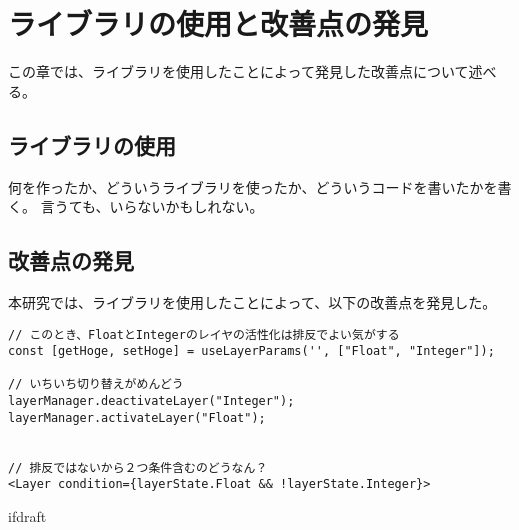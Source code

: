 \documentclass{jsarticle}
\begin{document}
    \fi
    \section{ライブラリの使用と改善点の発見}
    この章では、ライブラリを使用したことによって発見した改善点について述べる。
    \subsection{ライブラリの使用}
    何を作ったか、どういうライブラリを使ったか、どういうコードを書いたかを書く。
    言うても、いらないかもしれない。

    \subsection{改善点の発見}
    本研究では、ライブラリを使用したことによって、以下の改善点を発見した。

\begin{lstlisting}[caption=hoge,label=fuga]
// このとき、FloatとIntegerのレイヤの活性化は排反でよい気がする
const [getHoge, setHoge] = useLayerParams('', ["Float", "Integer"]);

// いちいち切り替えがめんどう
layerManager.deactivateLayer("Integer");
layerManager.activateLayer("Float");


// 排反ではないから２つ条件含むのどうなん？
<Layer condition={layerState.Float && !layerState.Integer}>
\end{lstlisting}



    \expandafter\ifx\csname ifdraft\endcsname\relax
\end{document}
